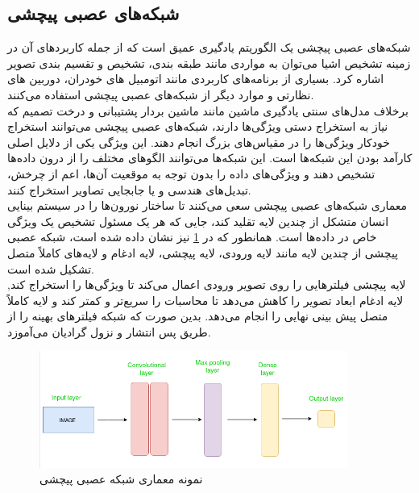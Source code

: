 \subsection{شبکه‌های عصبی پیچشی}
شبکه‌های عصبی پیچشی یک الگوریتم یادگیری عمیق است که از جمله کاربرد‌های آن در زمینه تشخیص اشیا می‌توان به مواردی مانند طبقه بندی، تشخیص و تقسیم بندی تصویر 
اشاره کرد. بسیاری از برنامه‌های کاربردی مانند اتومبیل های خودران، دوربین های نظارتی و موارد دیگر از شبکه‌های عصبی پیچشی استفاده می‌کنند.
\\
برخلاف مدل‌های سنتی یادگیری ماشین مانند ماشین بردار پشتیبانی و درخت‌ تصمیم
که نیاز به استخراج دستی ویژگی‌ها دارند، شبکه‌های عصبی پیچشی می‌توانند استخراج خودکار ویژگی‌ها را در مقیاس‌های بزرگ 
انجام دهند. این ویژگی یکی از دلایل اصلی کارآمد بودن این شبکه‌ها است. این شبکه‌ها می‌توانند الگوهای مختلف را از درون داده‌ها تشخیص دهند و ویژگی‌های داده را بدون توجه به موقعیت آن‌ها، اعم از چرخش، تبدیل‌‌های هندسی و یا جابجایی تصاویر استخراج کنند.
\\
معماری شبکه‌های عصبی پیچشی سعی می‌کنند تا ساختار نورون‌ها را در سیستم بینایی انسان متشکل از چندین لایه تقلید کند، جایی که هر یک مسئول تشخیص یک ویژگی خاص در داده‌ها است. 
همانطور که در 
\cref{cnn_arch}
نیز نشان داده شده است، شبکه عصبی پیچشی از چندین لایه مانند لایه ورودی، لایه پیچشی، لایه ادغام  و لایه‌های کاملاً متصل تشکیل شده است.
\\
لایه پیچشی فیلترهایی را روی تصویر ورودی اعمال می‌کند تا ویژگی‌ها را استخراج کند, لایه ادغام ابعاد تصویر را کاهش می‌دهد تا محاسبات را سریع‌تر و کمتر کند و لایه کاملاً متصل پیش بینی نهایی را انجام می‌دهد. بدین صورت که شبکه فیلترهای بهینه را از طریق پس انتشار
و نزول گرادیان
می‌آموزد.


\begin{figure}[h]
    \centering
    \includegraphics[width=0.9\textwidth]{CNN_arch.png}
    \caption[نمونه معماری شبکه عصبی پیچشی]{نمونه معماری شبکه عصبی پیچشی \cite{Introduc84:online}}\label{cnn_arch}
\end{figure}

